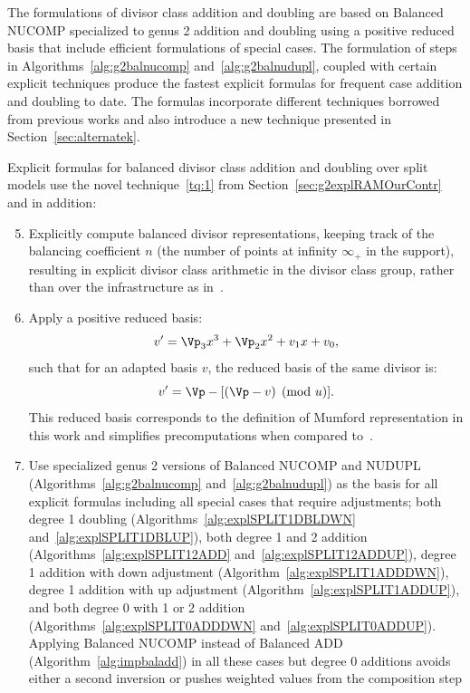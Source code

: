 The formulations of divisor class addition and doubling are based on Balanced
NUCOMP specialized to genus 2 addition and doubling using a positive reduced
basis that include efficient formulations of special cases. The formulation of
steps in Algorithms~\ref{alg:g2balnucomp} and~\ref{alg:g2balnudupl}, coupled
with certain explicit techniques produce the fastest explicit formulas for
frequent case addition and doubling to date. The formulas incorporate different
techniques borrowed from previous works and also introduce a new technique
presented in Section~\ref{sec:alternatek}. 

Explicit formulas for balanced divisor class addition and doubling over split
models use the novel technique~\ref{tq:1} from
Section~\ref{sec:g2explRAMOurContr} and in addition:
\begin{enumerate}[label=T\arabic*] \setcounter{enumi}{4}
\item \label{tq:5} Explicitly compute balanced divisor representations, keeping
track of the balancing coefficient $n$ (the number of points at infinity $\infty_+$
in the support), resulting in explicit divisor class arithmetic in the divisor
class group, rather than over the infrastructure as
in~\cite{EricksonJacobsonStein_realg2_2011}.
\item \label{tq:6} Apply a positive reduced basis: $$v' = \Vp_3x^3 + \Vp_2x^2 +
v_1x + v_0,$$ such that for an adapted basis $v$, the reduced basis of the same divisor is: $$v' =  \Vp
- [(\Vp - v) \pmod{u}].$$ This reduced basis corresponds to the definition of
Mumford representation in this work and simplifies precomputations when compared
to~\cite{EricksonJacobsonStein_realg2_2011}.
\item \label{tq:7} Use specialized genus 2 versions of Balanced NUCOMP and
NUDUPL (Algorithms~\ref{alg:g2balnucomp} and~\ref{alg:g2balnudupl}) as the basis for
all explicit formulas including all special cases that require adjustments;
both degree 1 doubling (Algorithms~\ref{alg:explSPLIT1DBLDWN}
and~\ref{alg:explSPLIT1DBLUP}), both degree 1 and 2 addition
(Algorithms~\ref{alg:explSPLIT12ADD} and~\ref{alg:explSPLIT12ADDUP}), degree 1
addition with down adjustment (Algorithm~\ref{alg:explSPLIT1ADDDWN}), degree 1
addition with up adjustment (Algorithm~\ref{alg:explSPLIT1ADDUP}), and both degree
0 with 1 or 2 addition (Algorithms~\ref{alg:explSPLIT0ADDDWN}
and~\ref{alg:explSPLIT0ADDUP}). Applying Balanced NUCOMP instead of Balanced ADD
(Algorithm~\ref{alg:impbaladd}) in all these cases but degree 0 additions avoids
either a second inversion or pushes weighted values from the composition step

\end{enumerate}
